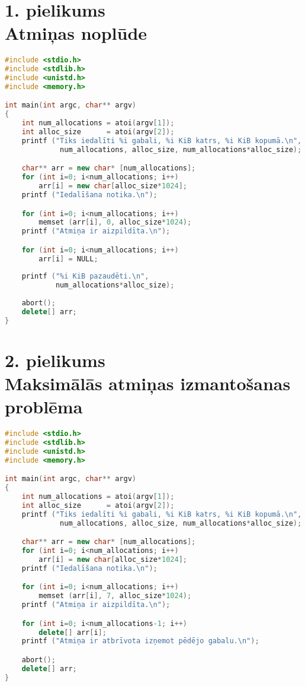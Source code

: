 ﻿

\chapter[1. pielikums. Atmiņas noplūde] {1. pielikums \\  Atmiņas noplūde}

    
   
\begin{lstlisting}[language=C++]
#include <stdio.h>
#include <stdlib.h>
#include <unistd.h>
#include <memory.h>

int main(int argc, char** argv)
{
	int num_allocations = atoi(argv[1]);
	int alloc_size      = atoi(argv[2]);
	printf ("Tiks iedalīti %i gabali, %i KiB katrs, %i KiB kopumā.\n",
	         num_allocations, alloc_size, num_allocations*alloc_size);

	char** arr = new char* [num_allocations];
	for (int i=0; i<num_allocations; i++)
		arr[i] = new char[alloc_size*1024];
	printf ("Iedalīšana notika.\n");

	for (int i=0; i<num_allocations; i++)
		memset (arr[i], 0, alloc_size*1024);
	printf ("Atmiņa ir aizpildīta.\n");

	for (int i=0; i<num_allocations; i++)
		arr[i] = NULL;
        
	printf ("%i KiB pazaudēti.\n", 
			num_allocations*alloc_size);
            
	abort();
	delete[] arr;
} 
\end{lstlisting}

\newpage
\chapter[2. pielikums. Maksimālās atmiņas izmantošanas problēma] {2. pielikums \\  Maksimālās atmiņas izmantošanas problēma}



\begin{lstlisting}[language=C++]
#include <stdio.h>
#include <stdlib.h>
#include <unistd.h>
#include <memory.h>

int main(int argc, char** argv)
{
	int num_allocations = atoi(argv[1]);
	int alloc_size      = atoi(argv[2]);
	printf ("Tiks iedalīti %i gabali, %i KiB katrs, %i KiB kopumā.\n",
	         num_allocations, alloc_size, num_allocations*alloc_size);

	char** arr = new char* [num_allocations];
	for (int i=0; i<num_allocations; i++)
		arr[i] = new char[alloc_size*1024];
	printf ("Iedalīšana notika.\n");

	for (int i=0; i<num_allocations; i++)
		memset (arr[i], 7, alloc_size*1024);
	printf ("Atmiņa ir aizpildīta.\n");

	for (int i=0; i<num_allocations-1; i++)
		delete[] arr[i];
	printf ("Atmiņa ir atbrīvota izņemot pēdējo gabalu.\n");

	abort();
	delete[] arr;
} 
\end{lstlisting}

